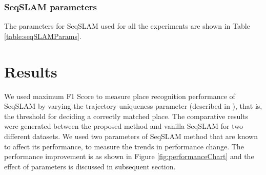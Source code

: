\documentclass[letterpaper, 10 pt, conference]{ieeeconf}  %
\begin{document}
\subsubsection{SeqSLAM parameters}
The parameters for SeqSLAM used for all the experiments are shown in Table \ref{table:seqSLAMParams}.

\section{Results}
We used maximum F1 Score to measure place recognition performance of SeqSLAM by varying the trajectory uniqueness parameter (described in \cite{Milford2012}), that is, the threshold for deciding a correctly matched place. The comparative results were generated between the proposed method and vanilla SeqSLAM for two different datasets. We used two parameters of SeqSLAM method that are known to affect its performance, to measure the trends in performance change. The performance improvement is as shown in Figure \ref{fig:performanceChart} and the effect of parameters is discussed in subsequent section. 
\end{document}
